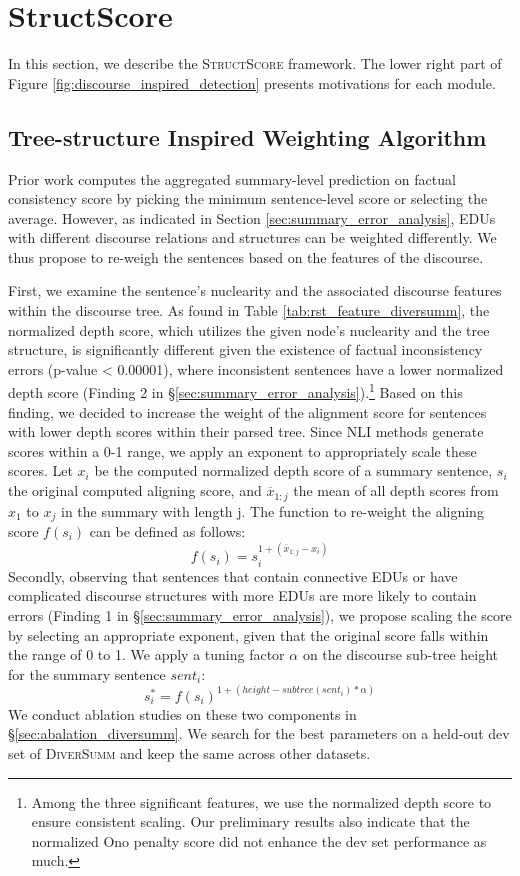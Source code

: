 \section{StructScore}
In this section, we describe the \textsc{StructScore} framework. The lower right part of Figure \ref{fig:discourse_inspired_detection} presents motivations for each module.
\subsection{Tree-structure Inspired Weighting Algorithm}\label{sec:reweight_algorithm}
Prior work \cite{zha-etal-2023-alignscore, scire-etal-2024-fenice} computes the aggregated summary-level prediction on factual consistency score by picking the minimum sentence-level score or selecting the average. However, as indicated in Section \ref{sec:summary_error_analysis}, EDUs with different discourse relations and structures can be weighted differently. We thus propose to re-weigh the sentences based on the features of the discourse. 

First, we examine the sentence's nuclearity and the associated discourse features within the discourse tree. As found in Table \ref{tab:rst_feature_diversumm}, the normalized depth score, which utilizes the given node's nuclearity and the tree structure, is significantly different given the existence of factual inconsistency errors (p-value < 0.00001), where inconsistent sentences have a lower normalized depth score (Finding 2 in \S \ref{sec:summary_error_analysis}).\footnote{Among the three significant features, we use the normalized depth score to ensure consistent scaling. Our preliminary results also indicate that the normalized Ono penalty score did not enhance the dev set performance as much. } Based on this finding, we decided to increase the weight of the alignment score for sentences with lower depth scores within their parsed tree. Since NLI methods generate scores within a 0-1 range, we apply an exponent to appropriately scale these scores.
Let \( x_i \) be the computed normalized depth score of a summary sentence, \(s_i\) the original computed aligning score,  and \( \overline{x}_{1:j} \) the mean of all depth scores from \( x_1 \) to \( x_j \) in the summary with length j. The function to re-weight the aligning score \( f(s_i) \) can be defined as follows:
\[
f(s_i) = 
s_i^{1+ (\overline{x}_{1:j} - x_i)} 
\]
Secondly, observing that sentences that contain connective EDUs or have complicated discourse structures with more EDUs are more likely to contain errors (Finding 1 in \S \ref{sec:summary_error_analysis}), we propose scaling the score by selecting an appropriate exponent, given that the original score falls within the range of 0 to 1. We apply a tuning factor $\alpha$ on the discourse sub-tree height for the summary sentence $sent_i$: 
\[s_i^{*} = f(s_i)^{1+({height-subtree}(sent_i)*\alpha)}\] We conduct ablation studies on these two components in \S \ref{sec:abalation_diversumm}. We search for the best parameters on a held-out dev set of \textsc{DiverSumm} and keep the same across other datasets.




